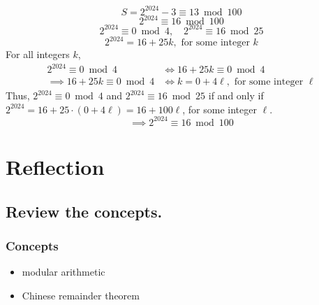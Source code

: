\documentclass{beamer} %
\begin{document}
\begin{frame}
  \[S = 2^{2024} - 3 \equiv \boxed{13} \bmod 100\]
  \[2^{2024} \equiv 16 \bmod 100\]
  \[2^{2024} \equiv 0 \bmod 4, \quad 2^{2024} \equiv 16 \bmod 25\]
  \[2^{2024} = 16 + 25k, \text{ for some integer } k\]
  For all integers $k$,
  \begin{align*}
    2^{2024} \equiv 0 \bmod 4 &\iff 16 + 25k \equiv 0 \bmod 4\\
    \implies 16 + 25k \equiv 0 \bmod 4 &\iff k = 0 + 4\ell, \text{ for some integer } \ell
  \end{align*}
  Thus, $2^{2024} \equiv 0 \bmod 4$ and $2^{2024} \equiv 16 \bmod 25$ if and only if $2^{2024} = 16 + 25 \cdot (0 + 4 \ell) = 16 + 100\ell$, for some integer $\ell$.
  \[\implies 2^{2024} \equiv 16 \bmod 100\]
\end{frame}

\setcounter{equation}{0} %

\section{Reflection}

\subsection*{Review the concepts.}

\begin{frame}
  \frametitle{Concepts}
  \begin{itemize}
    \item modular arithmetic
    \item Chinese remainder theorem
  \end{itemize}
\end{frame}
\end{document}
